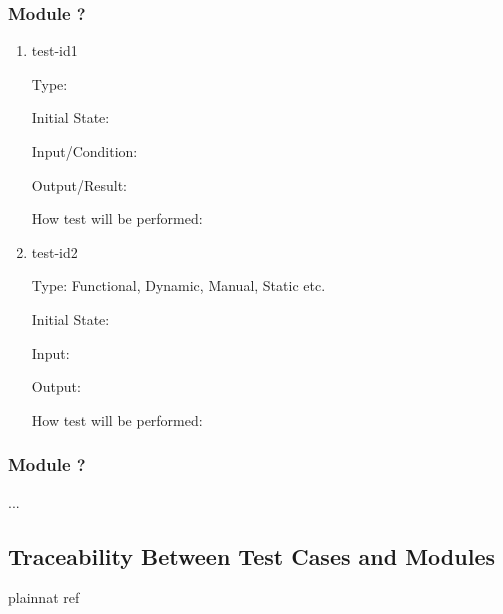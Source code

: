 \documentclass[12pt, titlepage]{article}
\begin{document}
\subsubsection{Module ?}
		
\begin{enumerate}

\item{test-id1\\}

Type: 
					
Initial State: 
					
Input/Condition: 
					
Output/Result: 
					
How test will be performed: 
					
\item{test-id2\\}

Type: Functional, Dynamic, Manual, Static etc.
					
Initial State: 
					
Input: 
					
Output: 
					
How test will be performed: 

\end{enumerate}

\subsubsection{Module ?}

...

\subsection{Traceability Between Test Cases and Modules}

				
\newpage

 {plainnat}
 {ref}








\end{document}
